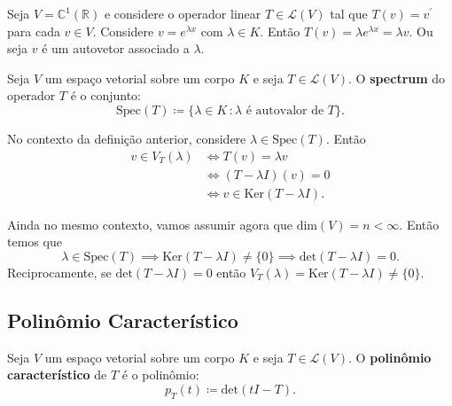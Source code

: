 \documentclass[11pt,twoside,a4paper]{book}
\begin{document}
\begin{exemplo}
Seja \(V=\mathbb{C}^1(\mathbb{R})\) e considere o operador linear \(T\in\mathcal{L}(V)\) tal que \(T(v)=v^\prime\) para cada \(v\in V\). Considere \(v=e^{\lambda x}\) com \(\lambda\in K\). Então \(T(v)=\lambda e^{\lambda x}=\lambda v\). Ou seja \(v\) é um autovetor associado a \(\lambda\).
\end{exemplo}

\begin{definicao}
Seja \(V\) um espaço vetorial sobre um corpo \(K\) e seja \(T\in\mathcal{L}(V)\). O \textbf{spectrum} do operador \(T\) é o conjunto:
\[\text{Spec}(T)\coloneqq\{\lambda\in K\,\colon \lambda \text{ é autovalor de } T\}.\]
\end{definicao}

\noindent
No contexto da definição anterior, considere
\(\lambda\in\text{Spec}(T)\). Então
\begin{align*}
v\in V_T(\lambda)&\iff T(v)=\lambda v\\&\iff (T-\lambda I)(v)=0\\&\iff v\in\text{Ker}(T-\lambda I).
\end{align*}

\noindent
Ainda no mesmo contexto, vamos assumir agora que \(\text{dim}(V)=n<\infty\). Então temos 
que \[\lambda\in\text{Spec}(T)\implies\text{Ker}(T-\lambda I)\not =\{0\}\implies\text{det}(T-\lambda I)=0.\]
Reciprocamente, se \(\text{det}(T-\lambda I)=0\) então \(V_T(\lambda)=\text{Ker}(T-\lambda I)\not=\{0\}\).

\subsection{Polinômio Característico}

\begin{definicao}
Seja \(V\) um espaço vetorial sobre um corpo \(K\) e seja \(T\in\mathcal{L}(V)\). O \textbf{polinômio característico} de \(T\) é o polinômio:
\[p_T(t)\coloneqq\text{det}(tI-T).\]
\end{definicao}
\end{document}
